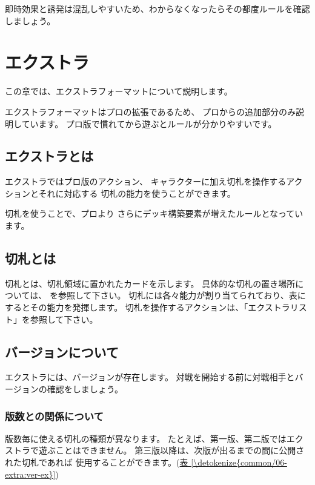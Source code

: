 \documentclass[letterpaper,10pt,dvipdfmx]{sphinxmanual}
\begin{document}
即時効果と誘発は混乱しやすいため、わからなくなったらその都度ルールを確認しましょう。


\section{エクストラ}
\label{\detokenize{common/06-extra:extra}}\label{\detokenize{common/06-extra:id1}}\label{\detokenize{common/06-extra::doc}}
この章では、エクストラフォーマットについて説明します。

エクストラフォーマットはプロの拡張であるため、
プロからの追加部分のみ説明しています。
プロ版で慣れてから遊ぶとルールが分かりやすいです。


\subsection{エクストラとは}
\label{\detokenize{common/06-extra:id2}}
エクストラではプロ版のアクション、
キャラクターに加え切札を操作するアクションとそれに対応する
切札の能力を使うことができます。

切札を使うことで、プロより
さらにデッキ構築要素が増えたルールとなっています。


\subsection{切札とは}
\label{\detokenize{common/06-extra:id3}}
切札とは、切札領域に置かれたカードを示します。
具体的な切札の置き場所については、 {\hyperref[\detokenize{common/01-base:field-ex}]{}} を参照して下さい。
切札には各々能力が割り当てられており、表にするとその能力を発揮します。
切札を操作するアクションは、「エクストラリスト」を参照して下さい。


\subsection{バージョンについて}
\label{\detokenize{common/06-extra:id4}}
エクストラには、バージョンが存在します。
対戦を開始する前に対戦相手とバージョンの確認をしましょう。


\subsubsection{版数との関係について}
\label{\detokenize{common/06-extra:id5}}
版数毎に使える切札の種類が異なります。
たとえば、第一版、第二版ではエクストラで遊ぶことはできません。
第三版以降は、次版が出るまでの間に公開された切札であれば
使用することができます。(\hyperref[\detokenize{common/06-extra:ver-ex}]{表 \ref{\detokenize{common/06-extra:ver-ex}}})
\end{document}
